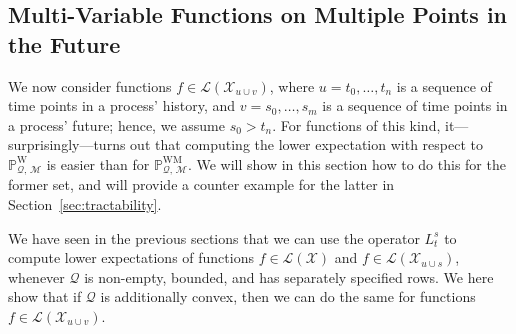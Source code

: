 \documentclass[10pt,a4paper]{paper}
\theoremstyle{definition}
\newcommand{\states}{\mathcal{X}}
\newcommand{\processes}{\mathbb{P}}
\newcommand{\wprocesses}{\processes^{\mathrm{W}}}
\newcommand{\wmprocesses}{\processes^{\mathrm{WM}}}
\newcommand{\gambles}{\mathcal{L}}
\newcommand{\gamblesX}{\gambles(\states)}
\newcommand{\rateset}{\mathcal{Q}}
\begin{document}
\subsection{Multi-Variable Functions on Multiple Points in the Future}\label{sec:decomposition}

We now consider functions $f\in\gambles(\states_{u\cup v})$, where $u=t_0,\ldots,t_n$ is a sequence of time points in a process' history, and $v=s_0,\ldots,s_m$ is a sequence of time points in a process' future; hence, we assume $s_0>t_n$. For functions of this kind, it---surprisingly---turns out that computing the lower expectation with respect to $\wprocesses_{\rateset,\,\mathcal{M}}$ is easier than for $\wmprocesses_{\rateset,\,\mathcal{M}}$. We will show in this section how to do this for the former set, and will provide a counter example for the latter in Section~\ref{sec:tractability}.

We have seen in the previous sections that we can use the operator $L_t^s$ to compute lower expectations of functions $f\in\gamblesX$ and $f\in\gambles(\states_{u\cup s})$, whenever $\rateset$ is non-empty, bounded, and has separately specified rows. We here show that if $\rateset$ is additionally convex, then we can do the same for functions $f\in\gambles(\states_{u\cup v})$.
\end{document}
